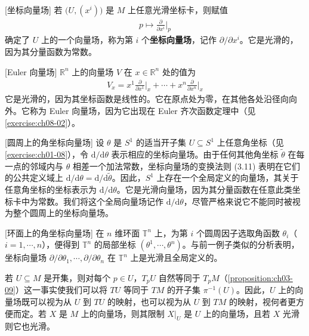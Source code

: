 \documentclass[../../main.tex]{subfiles}
\begin{document}
\begin{example}\label{example:ch08-02}[坐标向量场]
若 $\bigl(U,(x^i)\bigr)$ 是 $M$ 上任意光滑坐标卡，则赋值
\begin{align*}
p\mapsto\frac{\partial}{\partial x^i}\bigg|_p
\end{align*}
确定了 $U$ 上的一个向量场，称为第 $i$ 个\textbf{坐标向量场}，记作 $\partial/\partial x^i$。它是光滑的，因为其分量函数为常数。
\end{example}

\begin{example}\label{example:ch08-03}[Euler 向量场]
$\mathbb{R}^n$ 上的向量场 $V$ 在 $x\in\mathbb{R}^n$ 处的值为
\begin{align*}
V_x=x^1\frac{\partial}{\partial x^1}\bigg|_x+\cdots+x^n\frac{\partial}{\partial x^n}\bigg|_x
\end{align*}
它是光滑的，因为其坐标函数是线性的。它在原点处为零，在其他各处沿径向向外。它称为 Euler 向量场，因为它出现在 Euler 齐次函数定理中（见\cref{exercise:ch08-02}）。
\end{example}

\begin{example}\label{example:ch08-04}[圆周上的角坐标向量场]
设 $\theta$ 是 $S^1$ 的适当开子集 $U\subseteq S^1$ 上任意角坐标（见\cref{exercise:ch01-08}），令 $\mathrm{d}/\mathrm{d}\theta$ 表示相应的坐标向量场。由于任何其他角坐标 $\widetilde{\theta}$ 在每一点的邻域内与 $\theta$ 相差一个加法常数，坐标向量场的变换法则 (3.11) 表明在它们的公共定义域上 $\mathrm{d}/\mathrm{d}\theta=\mathrm{d}/\mathrm{d}\widetilde{\theta}$。因此，$S^1$ 上存在一个全局定义的向量场，其关于任意角坐标的坐标表示为 $\mathrm{d}/\mathrm{d}\theta$。它是光滑向量场，因为其分量函数在任意此类坐标卡中为常数。我们将这个全局向量场记作 $\mathrm{d}/\mathrm{d}\theta$，尽管严格来说它不能同时被视为整个圆周上的坐标向量场。
\end{example}

\begin{example}\label{example:ch08-05}[环面上的角坐标向量场]
在 $n$ 维环面 $\mathbb{T}^n$ 上，为第 $i$ 个圆周因子选取角函数 $\theta_i$（$i=1,\cdots ,n$），便得到 $\mathbb{T}^n$ 的局部坐标 $(\theta^1,\cdots ,\theta^n)$。与前一例子类似的分析表明，坐标向量场 $\partial/\partial\theta_1,\cdots ,\partial/\partial\theta_n$ 在 $\mathbb{T}^n$ 上是光滑且全局定义的。
\end{example}

若 $U\subseteq M$ 是开集，则对每个 $p\in U$，$T_pU$ 自然等同于 $T_pM$（\cref{proposition:ch03-09}）这一事实使我们可以将 $TU$ 等同于 $TM$ 的开子集 $\pi^{-1}(U)$。因此，$U$ 上的向量场既可以视为从 $U$ 到 $TU$ 的映射，也可以视为从 $U$ 到 $TM$ 的映射，视何者更方便而定。若 $X$ 是 $M$ 上的向量场，则其限制 $X|_U$ 是 $U$ 上的向量场，且若 $X$ 光滑则它也光滑。
\end{document}
